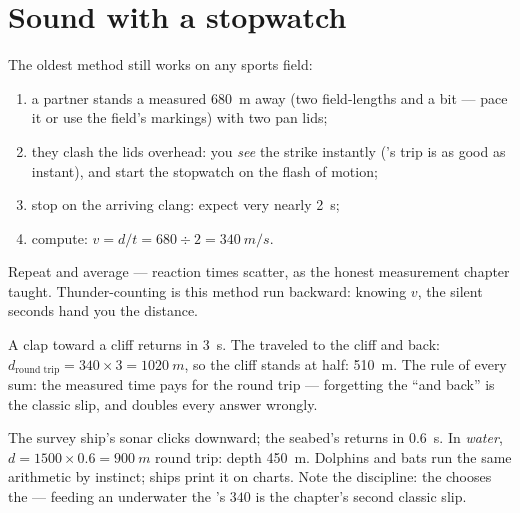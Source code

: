 \section{Sound with a stopwatch}

\begin{method}\label{met:g7:sound-production:measure}
The oldest method still works on any sports field:
\begin{enumerate}
  \item a partner stands a measured \qty{680}{m} away (two
        field-lengths and a bit --- pace it or use the field's
        markings) with two pan lids;
  \item they clash the lids overhead: you \emph{see} the strike
        instantly ('s trip is as good as instant), and
        start the stopwatch on the flash of motion;
  \item stop on the arriving clang: expect very nearly
        \qty{2}{s};
  \item compute: $v = d/t = 680 \div 2 = \qty{340}{m/s}$.
\end{enumerate}
Repeat and average --- reaction times scatter, as the honest
measurement chapter taught. Thunder-counting is this method run
backward: knowing $v$, the silent seconds hand you the
distance.
\end{method}

\begin{example}\label{ex:g7:sound-production:echo}
A clap toward a cliff returns in \qty{3}{s}. The  traveled
to the cliff and back: $d_{\text{round trip}} = 340 \times 3 =
\qty{1020}{m}$, so the cliff stands at half: \qty{510}{m}. The
rule of every  sum: the measured time pays for the round
trip --- forgetting the ``and back'' is the classic slip, and
doubles every answer wrongly.
\end{example}

\begin{example}\label{ex:g7:sound-production:sonar}
The survey ship's sonar clicks downward; the seabed's 
returns in \qty{0.6}{s}. In \emph{water}, $d = 1500 \times 0.6 =
\qty{900}{m}$ round trip: depth \qty{450}{m}. Dolphins and bats
run the same arithmetic by instinct; ships print it on charts.
Note the discipline: the  chooses the  --- feeding an
underwater  the 's $340$ is the chapter's second classic
slip.
\end{example}

